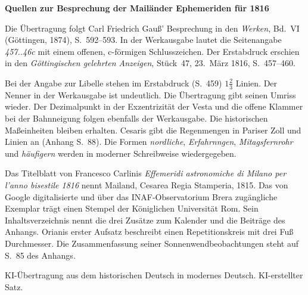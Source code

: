 \clearpage\thispagestyle{empty}
\begin{center}\Large\bfseries Quellen zur Besprechung der Mailänder Ephemeriden für 1816\end{center}

Die Übertragung folgt Carl Friedrich Gauß’ Besprechung in den \emph{Werken}, Bd.~VI (Göttingen, 1874), S.~592--593. In der Werkausgabe lautet die Seitenangabe \emph{457..46c} mit einem offenen, c-förmigen Schlusszeichen. Der Erstabdruck erschien in den \emph{Göttingischen gelehrten Anzeigen}, Stück~47, 23.~März 1816, S.~457--460.

Bei der Angabe zur Libelle stehen im Erstabdruck (S.~459) $1\frac{2}{3}$ Linien. Der Nenner in der Werkausgabe ist undeutlich. Die Übertragung gibt seinen Umriss wieder. Der Dezimalpunkt in der Exzentrizität der Vesta und die offene Klammer bei der Bahnneigung folgen ebenfalls der Werkausgabe. Die historischen Maßeinheiten bleiben erhalten. Cesaris gibt die Regenmengen in Pariser Zoll und Linien an (Anhang S.~88). Die Formen \emph{nordliche}, \emph{Erfahrnngen}, \emph{Mitagsfernrohr} und \emph{häufigern} werden in moderner Schreibweise wiedergegeben.

Das Titelblatt von Francesco Carlinis \emph{Effemeridi astronomiche di Milano per l’anno bisestile 1816} nennt Mailand, Cesarea Regia Stamperia, 1815. Das von Google digitalisierte und über das INAF-Observatorium Brera zugängliche Exemplar trägt einen Stempel der Königlichen Universität Rom. Sein Inhaltsverzeichnis nennt die drei Zusätze zum Kalender und die Beiträge des Anhangs. Orianis erster Aufsatz beschreibt einen Repetitionskreis mit drei Fuß Durchmesser. Die Zusammenfassung seiner Sonnenwendbeobachtungen steht auf S.~85 des Anhangs.

KI-Übertragung aus dem historischen Deutsch in modernes Deutsch. KI-erstellter Satz.


